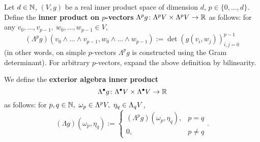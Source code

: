 \begin{definition}
  Let
    $d \in \mathbb{N}$,
    $(V, g)$ be a real inner product space of dimension $d$,
    $p \in \{0, ..., d\}$.
  Define the \textbf{inner product on $p$-vectors}
  $\Lambda^p g \colon \Lambda^p V \times \Lambda^p V \to \mathbb{R}$ as follows:
  for any $v_0, ..., v_{p - 1},\ w_0, ..., w_{p - 1} \in V$,
  \begin{equation}
    (\Lambda^p g)
    (v_0 \wedge ... \wedge v_{p - 1}, w_0 \wedge ... \wedge w_{p - 1})
    := \det (g(v_i, w_j))_{i, j = 0}^{p - 1}
  \end{equation}
  (in other words, on simple $p$-vectors $\Lambda^p g$ is constructed using
  the Gram determinant).
  For arbitrary $p$-vectors, expand the above definition by bilinearity.

  We define the \textbf{exterior algebra inner product}
  \begin{equation}
    \Lambda^\bullet g \colon \Lambda^\bullet V \times \Lambda^\bullet V \to \mathbb{R}
  \end{equation}
  as follows:
  for $p, q \in \mathbb{N},\ \omega_p \in \Lambda^p V,\ \eta_q \in \Lambda_q V$,
  \begin{equation}
    (\Lambda g)(\omega_p, \eta_q) :=
    \begin{cases}
      (\Lambda^p g)(\omega_p, \eta_q), & p = q \\
      0, & p \neq q
    \end{cases}.
  \end{equation}
\end{definition}
